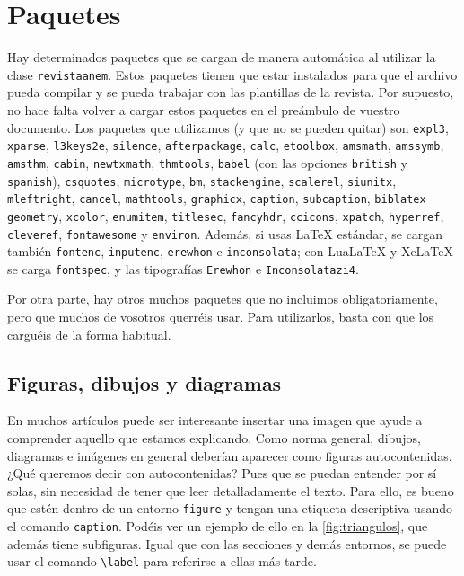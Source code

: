 \documentclass[bibtex]{TEMat-article}
\begin{document}
\section{Paquetes}

Hay determinados paquetes que se cargan de manera automática al utilizar la clase \verb+revistaanem+.
Estos paquetes tienen que estar instalados para que el archivo pueda compilar y se pueda trabajar con las plantillas de la revista.
Por supuesto, no hace falta volver a cargar estos paquetes en el preámbulo de vuestro documento.
Los paquetes que utilizamos (y que no se pueden quitar) son \verb+expl3+, \verb+xparse+, \verb+l3keys2e+, \verb+silence+, \verb+afterpackage+, \verb+calc+, \verb+etoolbox+, \verb+amsmath+, \verb+amssymb+, \verb+amsthm+, \verb+cabin+, \verb+newtxmath+,  \verb+thmtools+, \verb+babel+ (con las opciones \verb+british+ y \verb+spanish+), \verb+csquotes+, \verb+microtype+, \verb+bm+, \verb+stackengine+, \verb+scalerel+, \verb+siunitx+, \verb+mleftright+, \verb+cancel+, \verb+mathtools+, \verb+graphicx+, \verb+caption+, \verb+subcaption+, \verb+biblatex+ \verb+geometry+, \verb+xcolor+, \verb+enumitem+, \verb+titlesec+, \verb+fancyhdr+, \verb+ccicons+, \verb+xpatch+, \verb+hyperref+, \verb+cleveref+, \verb+fontawesome+ y \verb+environ+.
Además, si usas LaTeX estándar, se cargan también \verb+fontenc+, \verb+inputenc+, \verb+erewhon+ e \verb+inconsolata+; con LuaLaTeX y XeLaTeX se carga \verb+fontspec+, y las tipografías \verb+Erewhon+ e \verb+Inconsolatazi4+.

Por otra parte, hay otros muchos paquetes que no incluimos obligatoriamente, pero que muchos de vosotros querréis usar.
Para utilizarlos, basta con que los carguéis de la forma habitual.

\subsection{Figuras, dibujos y diagramas}\label{sec:diagramas}
En muchos artículos puede ser interesante insertar una imagen que ayude a comprender aquello que estamos explicando.
Como norma general, dibujos, diagramas e imágenes en general deberían aparecer como figuras autocontenidas.
¿Qué queremos decir con autocontenidas?
Pues que se puedan entender por sí solas, sin necesidad de tener que leer detalladamente el texto.
Para ello, es bueno que estén dentro de un entorno \verb+figure+ y tengan una etiqueta descriptiva usando el comando \verb+caption+.
Podéis ver un ejemplo de ello en la \cref{fig:triangulos}, que además tiene subfiguras.
Igual que con las secciones y demás entornos, se puede usar el comando \verb+\label+ para referirse a ellas más tarde.
\end{document}
